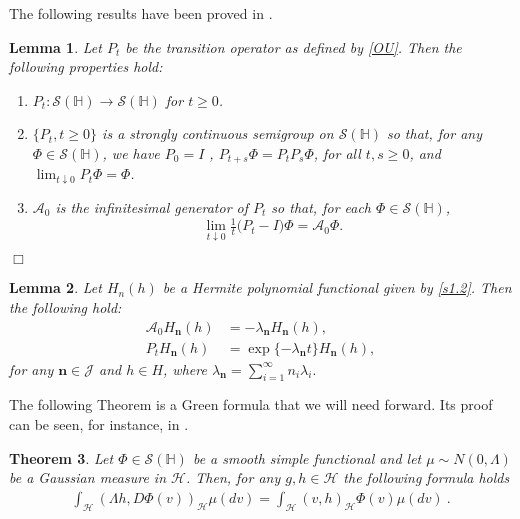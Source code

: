 \documentclass[]{interact}
\theoremstyle{plain}%
\newtheorem{theorem}{Theorem}[section]
\newtheorem{lemma}[theorem]{Lemma}
\theoremstyle{definition}
\theoremstyle{remark}
\begin{document}
    The following results have been proved in \cite{liu}.
    \begin{lemma}
        Let $P_t$ be the transition operator as defined by \eqref{OU}. Then
        the following properties hold:
        \begin{enumerate}
         \item
            $P_t : \mathcal{S}(\mathbb{H})\rightarrow  \mathcal{S}(\mathbb{H})$
            for $t \ge 0$.
        \item
            $\{P_t , t \ge 0\}$
            is a strongly continuous semigroup on
            $\mathcal{S}(\mathbb{H})$ so that, for any
            $\Phi \in \mathcal{S}(\mathbb{H})$, we have $P_0 = I$ ,
            $P_{t+s} \Phi = P_t P_s \Phi$, for all $t, s \ge 0$, and
            $\lim_{t\downarrow 0}
            P_t \Phi = \Phi$.
        \item
            $\mathcal{A}_0$ is the infinitesimal generator of $P_t$ so that, for
            each $\Phi\in\mathcal{S}(\mathbb{H})$,
            \[
                \lim_{t\downarrow 0} \tfrac{1}{t}\big(P_t- I\big)\Phi
                    = \mathcal{A}_0\Phi.
            \]
        \end{enumerate}
        \hfill $\Box$
    \end{lemma}

    \begin{lemma}\label{Pt-Her}
            Let $H_n(h)$ be a Hermite polynomial functional given by 
            \eqref{s1.2}.
            Then the following hold:
        \begin{align}
            \mathcal{A}_0 H_{\mathbf{n}}(h) 
                &= -\lambda_{\mathbf{n}} H_{\mathbf{n}}(h),
                \\
            P_t H_{\mathbf{n}} (h)
                &= \exp\{-\lambda_{\mathbf{n}} t\} H_{\mathbf{n}} (h),
        \end{align}
        for any $\mathbf{n}\in\mathcal{J}$ and $h \in H$, where
        $
            \displaystyle
            \lambda_{\mathbf{n}}=\sum_{i=1}^\infty n_i\lambda_i.
        $
    \end{lemma}

    The following Theorem is a Green formula that we will need forward.
    Its proof can be seen, for instance, in \cite[][Thm. 3.3, Ch. 9]{liu}.

    \begin{theorem}\label{green-form}
        Let
        $
            \Phi \in \mathcal{S}(\mathbb{H})
        $ be a smooth simple functional and let
        $\mu\sim N(0,\Lambda)$ be a Gaussian measure in $\mathcal{H}$. Then,
        for any $g,h\in\mathcal{H}$ the following formula holds
        \begin{align}
            \int_{\mathcal{H}} (\Lambda h,D\Phi(v))_{\mathcal{H}}  \mu(dv) =
                \int_{\mathcal{H}} (v,h)_{\mathcal{H}}
                \Phi(v) \mu(dv) \ .
                \label{s2.2.1}
        \end{align}
    \end{theorem}
\end{document}
